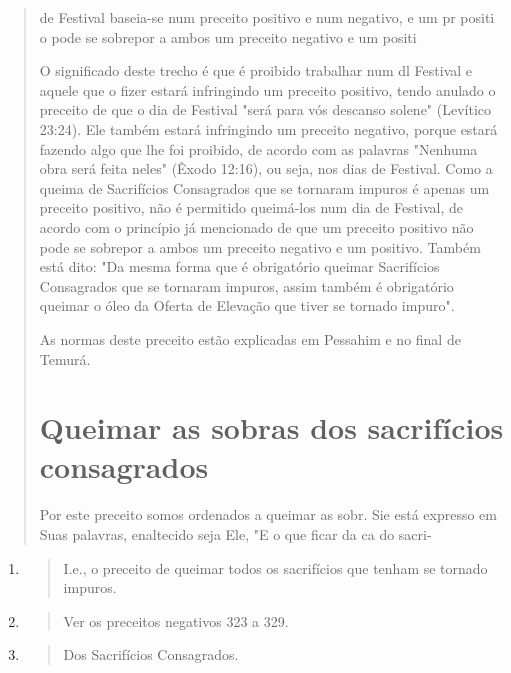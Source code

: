 \begin{quote}
de Festival baseia-se num preceito positivo e num negativo, e um pr
positi o pode se sobrepor a ambos um preceito negativo e um positi

O significado deste trecho é que é proibido trabalhar num dl Festival e
aquele que o fizer estará infringindo um preceito positivo, tendo
anu­lado o preceito de que o dia de Festival "será para vós descanso
solene" (Leví­tico 23:24). Ele também estará infringindo um preceito
negativo, porque estará fazendo algo que lhe foi proibido, de acordo com
as palavras "Nenhuma obra será feita neles" (Êxodo 12:16), ou seja, nos
dias de Festival. Como a queima de Sacrifícios Consagrados que se
tornaram impuros é apenas um preceito po­sitivo, não é permitido
queimá-los num dia de Festival, de acordo com o prin­cípio já mencionado
de que um preceito positivo não pode se sobrepor a am­bos um preceito
negativo e um positivo. Também está dito: "Da mesma forma que é
obrigatório queimar Sacrifícios Consagrados que se tornaram impuros,
assim também é obrigatório queimar o óleo da Oferta de Elevação que
tiver se tornado impuro".

As normas deste preceito estão explicadas em Pessahim e no final de
Temurá.

\section{Queimar as sobras dos sacrifícios consagrados}

Por este preceito somos ordenados a queimar as sobr. Sie está expresso
em Suas palavras, enaltecido seja Ele, "E o que ficar da ca do sacri-
\end{quote}

\begin{enumerate}
\def\labelenumi{\arabic{enumi}.}
\setcounter{enumi}{118}
\item
 \begin{quote}
 I.e., o preceito de queimar todos os sacrifícios que tenham se tornado
 impuros.
 \end{quote}
\item
 \begin{quote}
 Ver os preceitos negativos 323 a 329.
 \end{quote}
\item
 \begin{quote}
 Dos Sacrifícios Consagrados.
 \end{quote}
\end{enumerate}

